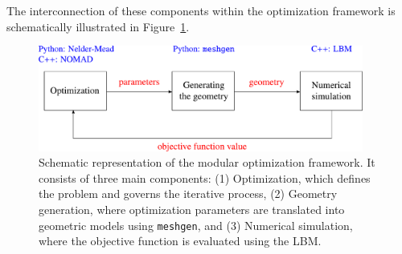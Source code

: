 The interconnection of these components within the optimization framework is schematically illustrated in Figure~\ref{fig:framework}.


\begin{figure}[H]
	\vspace{5mm}
	\centering
	\includegraphics[width=0.95\textwidth]{figures/framework-en.pdf}
	\vspace{5mm}
	\caption{Schematic representation of the modular optimization framework. It consists of three main components: (1) Optimization, which defines the problem and governs the iterative process, (2) Geometry generation, where optimization parameters are translated into geometric models using \texttt{meshgen}, and (3) Numerical simulation, where the objective function is evaluated using the LBM.}
	\label{fig:framework}
	
\end{figure}